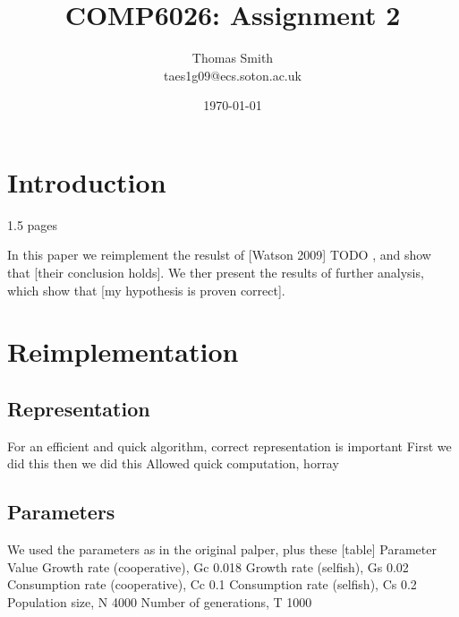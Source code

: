 \documentclass[11pt]{article}
\begin{document}
\title      {\textbf{COMP6026: Assignment 2}}
\author	    {Thomas Smith\\taes1g09@ecs.soton.ac.uk}
\date       {\today}
\maketitle
\section{Introduction}
1.5 pages

In this paper we reimplement the resulst of [Watson 2009] TODO , and show that [their conclusion holds]. We ther present the results of further analysis, which show that [my hypothesis is proven correct].
\section{Reimplementation}

\subsection{Representation}
For an efficient and quick algorithm, correct representation is important
First we did this
then we did this
Allowed quick computation, horray

\subsection{Parameters}
We used the parameters as in the original palper, plus these
[table]
Parameter
Value
Growth rate (cooperative), Gc
0.018
Growth rate (selfish), Gs
0.02
Consumption rate (cooperative), Cc
0.1
Consumption rate (selfish), Cs
0.2
Population size, N
4000
Number of generations, T
1000

\end{document}

